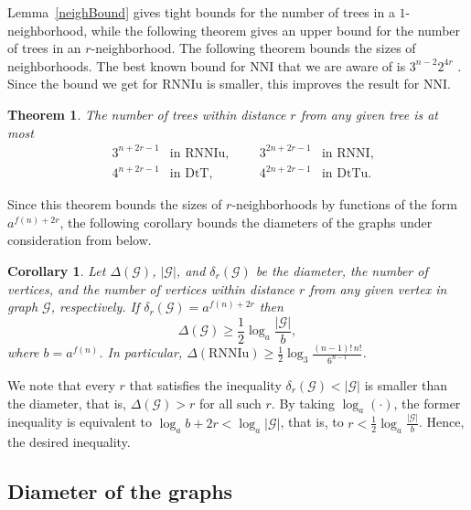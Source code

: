 \documentclass[11pt]{amsart}
\newtheorem{corollary}[lemma]{Corollary}
\newtheorem{theorem}[lemma]{Theorem}
\theoremstyle{definition}
\newcommand{\nni}{\mathrm{NNI}}
\newcommand{\rnni}{\mathrm{RNNI}}
\newcommand{\rnniu}{\mathrm{RNNIu}}
\newcommand{\dtt}{\mathrm{DtT}}
\newcommand{\dttu}{\mathrm{DtTu}}
\newcommand{\G}{\mathcal{G}}
\begin{document}
Lemma~\ref{neighBound} gives tight bounds for the number of trees in a $1$-neighborhood, while the following theorem gives an upper bound for the number of trees in an $r$-neighborhood.
The following theorem bounds the sizes of neighborhoods.
The best known bound for $\nni$ that we are aware of is $3^{n-2} 2^{4r}$ \autocite{li1996some}.
Since the bound we get for $\rnniu$ is smaller, this improves the result for $\nni$.

\begin{theorem}
\label{neighSizeTh}
The number of trees within distance $r$ from any given tree is at most
\begin{align*}
& 3^{n+2r-1}	& \mbox{in $\rnniu$,}
&&& 3^{2n+2r-1}	& \mbox{in $\rnni$,}\\
& 4^{n+2r-1}	& \mbox{in $\dtt$,}
&&& 4^{2n+2r-1}	& \mbox{in $\dttu$.}
\end{align*}
\end{theorem}

Since this theorem bounds the sizes of $r$-neighborhoods by functions of the form $a^{f(n) + 2r}$, the following corollary bounds the diameters of the graphs under consideration from below.

\begin{corollary}
Let $\Delta(\G)$, $|\G|$, and $\delta_r(\G)$ be the diameter, the number of vertices, and the number of vertices within distance $r$ from any given vertex in graph $\G$, respectively.
If $\delta_r(\G) = a^{f(n) + 2r}$ then
\[
\Delta(\G) \geq \frac 12 \log_a\frac{|\G|}{b},
\]
where $b = a^{f(n)}$.
In particular, $\Delta(\rnniu) \geq \frac 12 \log_3\frac{(n-1)!\,n!}{6^{n-1}}$.
\end{corollary}

\proof
We note that every $r$ that satisfies the inequality $\delta_r(\G) < |\G|$ is smaller than the diameter, that is, $\Delta(\G) > r$ for all such $r$.
By taking $\log_a(\cdot)$, the former inequality is equivalent to $\log_ab + 2r < \log_a|\G|$, that is, to $r < \frac 12 \log_a\frac{|\G|}{b}$.
Hence, the desired inequality.
\endproof


\subsection{Diameter of the graphs}
\end{document}
